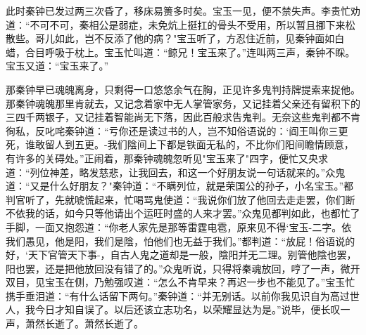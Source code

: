 此时秦钟已发过两三次昏了，移床易箦多时矣。宝玉一见，便不禁失声。李贵忙劝道：“不可不可，秦相公是弱症，未免炕上挺扛的骨头不受用，所以暂且挪下来松散些。哥儿如此，岂不反添了他的病？"宝玉听了，方忍住近前，见秦钟面如白蜡，合目呼吸于枕上。宝玉忙叫道：“鲸兄！宝玉来了。”连叫两三声，秦钟不睬。宝玉又道：“宝玉来了。”

那秦钟早已魂魄离身，只剩得一口悠悠余气在胸，正见许多鬼判持牌提索来捉他。那秦钟魂魄那里肯就去，又记念着家中无人掌管家务，又记挂着父亲还有留积下的三四千两银子，又记挂着智能尚无下落，因此百般求告鬼判。无奈这些鬼判都不肯徇私，反叱咤秦钟道：“亏你还是读过书的人，岂不知俗语说的：`阎王叫你三更死，谁敢留人到五更。-我们陰间上下都是铁面无私的，不比你们阳间瞻情顾意，有许多的关碍处。”正闹着，那秦钟魂魄忽听见"宝玉来了"四字，便忙又央求道：“列位神差，略发慈悲，让我回去，和这一个好朋友说一句话就来的。”众鬼道：“又是什么好朋友？"秦钟道：“不瞒列位，就是荣国公的孙子，小名宝玉。”都判官听了，先就唬慌起来，忙喝骂鬼使道：“我说你们放了他回去走走罢，你们断不依我的话，如今只等他请出个运旺时盛的人来才罢。”众鬼见都判如此，也都忙了手脚，一面又抱怨道：“你老人家先是那等雷霆电雹，原来见不得`宝玉-二字。依我们愚见，他是阳，我们是陰，怕他们也无益于我们。”都判道：“放屁！俗语说的好，`天下官管天下事-，自古人鬼之道却是一般，陰阳并无二理。别管他陰也罢，阳也罢，还是把他放回没有错了的。”众鬼听说，只得将秦魂放回，哼了一声，微开双目，见宝玉在侧，乃勉强叹道：“怎么不肯早来？再迟一步也不能见了。”宝玉忙携手垂泪道：“有什么话留下两句。”秦钟道：“并无别话。以前你我见识自为高过世人，我今日才知自误了。以后还该立志功名，以荣耀显达为是。”说毕，便长叹一声，萧然长逝了。萧然长逝了。
